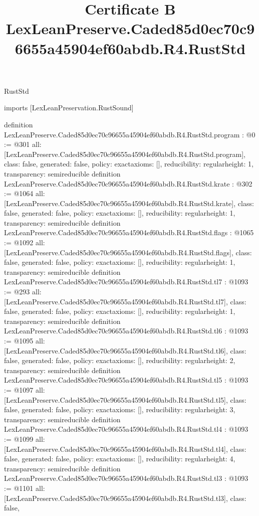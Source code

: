 \begin{lexlean}{RustStd}
\title{Certificate B LexLeanPreserve.Caded85d0ec70c96655a45904ef60abdb.R4.RustStd}
\begin{coremodule}
imports [LexLeanPreservation.RustSound]

definition LexLeanPreserve.Caded85d0ec70c96655a45904ef60abdb.R4.RustStd.program : @0 := @301 {
  all: [LexLeanPreserve.Caded85d0ec70c96655a45904ef60abdb.R4.RustStd.program],
  class: false,
  generated: false,
  policy: exact{axioms: []},
  reducibility: regular{height: 1},
  transparency: semireducible
}
definition LexLeanPreserve.Caded85d0ec70c96655a45904ef60abdb.R4.RustStd.krate : @302 := @1064 {
  all: [LexLeanPreserve.Caded85d0ec70c96655a45904ef60abdb.R4.RustStd.krate],
  class: false,
  generated: false,
  policy: exact{axioms: []},
  reducibility: regular{height: 1},
  transparency: semireducible
}
definition LexLeanPreserve.Caded85d0ec70c96655a45904ef60abdb.R4.RustStd.flags : @1065 := @1092 {
  all: [LexLeanPreserve.Caded85d0ec70c96655a45904ef60abdb.R4.RustStd.flags],
  class: false,
  generated: false,
  policy: exact{axioms: []},
  reducibility: regular{height: 1},
  transparency: semireducible
}
definition LexLeanPreserve.Caded85d0ec70c96655a45904ef60abdb.R4.RustStd.tl7 : @1093 := @293 {
  all: [LexLeanPreserve.Caded85d0ec70c96655a45904ef60abdb.R4.RustStd.tl7],
  class: false,
  generated: false,
  policy: exact{axioms: []},
  reducibility: regular{height: 1},
  transparency: semireducible
}
definition LexLeanPreserve.Caded85d0ec70c96655a45904ef60abdb.R4.RustStd.tl6 : @1093 := @1095 {
  all: [LexLeanPreserve.Caded85d0ec70c96655a45904ef60abdb.R4.RustStd.tl6],
  class: false,
  generated: false,
  policy: exact{axioms: []},
  reducibility: regular{height: 2},
  transparency: semireducible
}
definition LexLeanPreserve.Caded85d0ec70c96655a45904ef60abdb.R4.RustStd.tl5 : @1093 := @1097 {
  all: [LexLeanPreserve.Caded85d0ec70c96655a45904ef60abdb.R4.RustStd.tl5],
  class: false,
  generated: false,
  policy: exact{axioms: []},
  reducibility: regular{height: 3},
  transparency: semireducible
}
definition LexLeanPreserve.Caded85d0ec70c96655a45904ef60abdb.R4.RustStd.tl4 : @1093 := @1099 {
  all: [LexLeanPreserve.Caded85d0ec70c96655a45904ef60abdb.R4.RustStd.tl4],
  class: false,
  generated: false,
  policy: exact{axioms: []},
  reducibility: regular{height: 4},
  transparency: semireducible
}
definition LexLeanPreserve.Caded85d0ec70c96655a45904ef60abdb.R4.RustStd.tl3 : @1093 := @1101 {
  all: [LexLeanPreserve.Caded85d0ec70c96655a45904ef60abdb.R4.RustStd.tl3],
  class: false,
}
\end{coremodule}
\end{lexlean}
